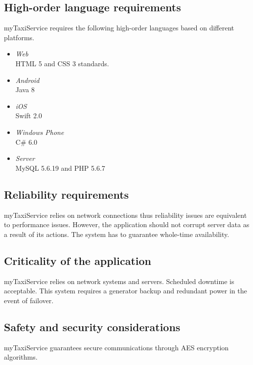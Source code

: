 \subsection{High-order language requirements}
myTaxiService requires the following high-order languages based on different platforms.
\begin{itemize}
	\item\textit{Web}\\
	HTML 5 and CSS 3 standards.
	\item\textit{Android}\\
	Java 8
	\item\textit{iOS}\\
	Swift 2.0
	\item\textit{Windows Phone}\\
	C\# 6.0
	\item \textit{Server}\\
	MySQL 5.6.19 and PHP 5.6.7
\end{itemize}


\subsection{Reliability requirements}
myTaxiService relies on network connections thus reliability issues are equivalent to performance issues.  However, the application should not corrupt server data as a result of its actions. The system has to guarantee whole-time availability.

\subsection{Criticality of the application}
 myTaxiService relies on network systems and servers. Scheduled downtime is acceptable. This system requires a generator backup and redundant power in the event of failover.

\subsection{Safety and security considerations}
myTaxiService guarantees secure communications through AES encryption algorithms.